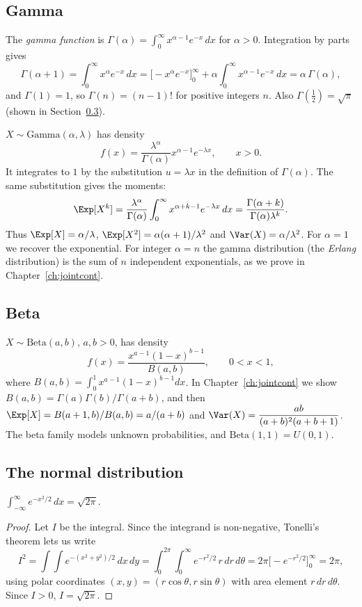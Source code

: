 \subsection{Gamma}

The \emph{gamma function} is $\Gamma(\alpha)=\int_0^\infty x^{\alpha-1}e^{-x}\,dx$
for $\alpha>0$. Integration by parts gives
\[
\Gamma(\alpha+1)=\int_0^\infty x^\alpha e^{-x}\,dx=\bigl[-x^\alpha e^{-x}\bigr]_0^\infty
+\alpha\int_0^\infty x^{\alpha-1}e^{-x}\,dx=\alpha\,\Gamma(\alpha),
\]
and $\Gamma(1)=1$, so $\Gamma(n)=(n-1)!$ for positive integers $n$. Also
$\Gamma(\tfrac12)=\sqrt\pi$ (shown in Section~\ref{sec:normal}).

$X\sim\mathrm{Gamma}(\alpha,\lambda)$ has density
\[
f(x)=\frac{\lambda^\alpha}{\Gamma(\alpha)}x^{\alpha-1}e^{-\lambda x},\qquad x>0 .
\]
It integrates to $1$ by the substitution $u=\lambda x$ in the definition of
$\Gamma(\alpha)$. The same substitution gives the moments:
\[
\Exp[X^k]=\frac{\lambda^\alpha}{\Gamma(\alpha)}\int_0^\infty x^{\alpha+k-1}e^{-\lambda x}\,dx
=\frac{\Gamma(\alpha+k)}{\Gamma(\alpha)\lambda^k}.
\]
Thus $\Exp[X]=\alpha/\lambda$, $\Exp[X^2]=\alpha(\alpha+1)/\lambda^2$ and
$\Var(X)=\alpha/\lambda^2$. For $\alpha=1$ we recover the exponential. For
integer $\alpha=n$ the gamma distribution (the \emph{Erlang} distribution) is the
sum of $n$ independent exponentials, as we prove in
Chapter~\ref{ch:jointcont}.

\subsection{Beta}

$X\sim\mathrm{Beta}(a,b)$, $a,b>0$, has density
\[
f(x)=\frac{x^{a-1}(1-x)^{b-1}}{B(a,b)},\qquad0<x<1,
\]
where $B(a,b)=\int_0^1x^{a-1}(1-x)^{b-1}dx$. In Chapter~\ref{ch:jointcont} we show
$B(a,b)=\Gamma(a)\Gamma(b)/\Gamma(a+b)$, and then
$\Exp[X]=B(a+1,b)/B(a,b)=a/(a+b)$ and $\Var(X)=\dfrac{ab}{(a+b)^2(a+b+1)}$.
The beta family models unknown probabilities, and $\mathrm{Beta}(1,1)=U(0,1)$.

\subsection{The normal distribution}\label{sec:normal}

\begin{theorem}\label{thm:gauss}
$\displaystyle\int_{-\infty}^\infty e^{-x^2/2}\,dx=\sqrt{2\pi}$.
\end{theorem}
\begin{proof}
Let $I$ be the integral. Since the integrand is non-negative, Tonelli's theorem lets us write
\[
I^2=\int\!\!\int e^{-(x^2+y^2)/2}\,dx\,dy=\int_0^{2\pi}\!\!\int_0^\infty e^{-r^2/2}\,r\,dr\,d\theta
=2\pi\bigl[-e^{-r^2/2}\bigr]_0^\infty=2\pi,
\]
using polar coordinates $(x,y)=(r\cos\theta,r\sin\theta)$ with area element
$r\,dr\,d\theta$. Since $I>0$, $I=\sqrt{2\pi}$.
\end{proof}


